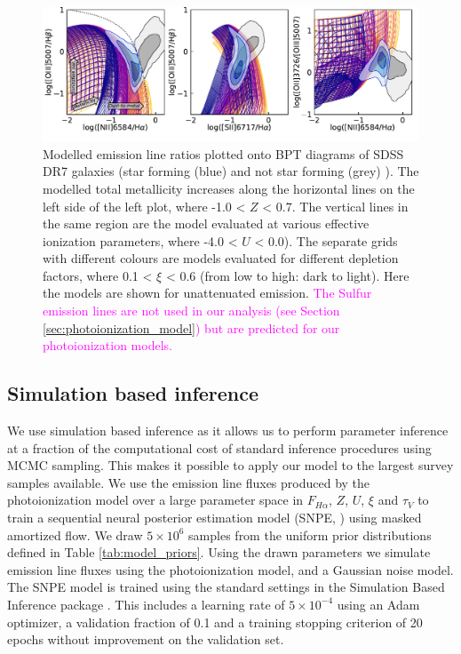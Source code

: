 \documentclass[fleqn,usenatbib]{mnras}
\begin{document}
\begin{figure}
    \centering
    \includegraphics[width=\textwidth]{figures/fig1.pdf}
    \caption{Modelled emission line ratios plotted onto BPT diagrams of SDSS DR7 galaxies (star forming (blue) and not star forming (grey) \citep{kauffmann2003}). The modelled total metallicity increases along the horizontal lines on the left side of the left plot, where -1.0 < $Z$ < 0.7. The vertical lines in the same region are the model evaluated at various effective ionization parameters, where -4.0 < $U$ < 0.0). The separate grids with different colours are models evaluated for different depletion factors, where 0.1 < $\xi$ < 0.6 (from low to high: dark to light). Here the models are shown for unattenuated emission. \textcolor{magenta}{The Sulfur emission lines are not used in our analysis (see Section \ref{sec:photoionization_model}) but are predicted for our photoionization models.}}
    \label{fig:photoionization_model_BPT}
\end{figure}

\subsection{Simulation based inference}
We use simulation based inference as it allows us to perform parameter inference at a fraction of the computational cost of standard inference procedures using MCMC sampling. This makes it possible to apply our model to the largest survey samples available. We use the emission line fluxes produced by the photoionization model over a large parameter space in $F_{H\alpha}$, $Z$, $U$, $\xi$ and $\tau_V$ to train a sequential neural posterior estimation model (SNPE, \cite{greenberg2019}) using masked amortized flow.  We draw $5\times10^6$ samples from the uniform prior distributions defined in Table \ref{tab:model_priors}. Using the drawn parameters we simulate emission line fluxes using the photoionization model, and a Gaussian noise model. The SNPE model is trained using the standard settings in the Simulation Based Inference package \citep{tejero-cantero2020}. This includes a learning rate of $5 \times 10^{-4}$ using an Adam optimizer, a validation fraction of 0.1 and a training stopping criterion of 20 epochs without improvement on the validation set. 
\end{document}
